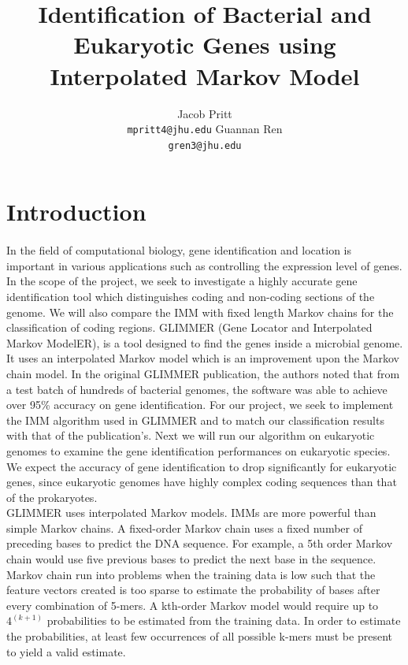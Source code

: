 \documentclass[11pt,letterpaper]{article}
\title{Identification of Bacterial and Eukaryotic Genes using Interpolated Markov Model}
\author{Jacob Pritt\\
  {\tt mpritt4@jhu.edu}
  \And
  Guannan Ren \\
  {\tt gren3@jhu.edu}}
\date{}
\begin{document}
\maketitle
\begin{abstract}

\end{abstract}

\section{Introduction}
\paragraph{}
In the field of computational biology, gene identification and location is important in various applications such as controlling the expression level of genes. In the scope of the project, we seek to investigate a highly accurate gene identification tool which distinguishes coding and non-coding sections of the genome. We will also compare the IMM with fixed length Markov chains for the classification of coding regions. GLIMMER (Gene Locator and Interpolated Markov ModelER), is a tool designed to find the genes inside a microbial genome. It uses an interpolated Markov model which is an improvement upon the Markov chain model. In the original GLIMMER publication, the authors noted that from a test batch of hundreds of bacterial genomes, the software was able to achieve over 95\% accuracy on gene identification. For our project, we seek to implement the IMM algorithm used in GLIMMER and to match our classification results with that of the publication's. Next we will run our algorithm on eukaryotic genomes to examine the gene identification performances on eukaryotic species. We expect the accuracy of gene identification to drop significantly for eukaryotic genes, since eukaryotic genomes have highly complex coding sequences than that of the prokaryotes.\\

GLIMMER uses interpolated Markov models. IMMs are more powerful than simple Markov chains. A fixed-order Markov chain uses a fixed number of preceding bases to predict the DNA sequence. For example, a 5th order Markov chain would use five previous bases to predict the next base in the sequence. Markov chain run into problems when the training data is low such that the feature vectors created is too sparse to estimate the probability of bases after every combination of 5-mers. A kth-order Markov model would require up to $4^ (k+1)$ probabilities to be estimated from the training data. In order to estimate the probabilities, at least few occurrences of all possible k-mers must be present to yield a valid estimate. \\
\end{document}

